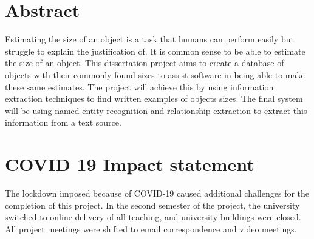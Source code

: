 \chapter*{\Large \center Abstract}

Estimating the size of an object is a task that humans can perform easily but struggle to explain the justification of. It is common sense to be able to estimate the size of an object. This dissertation project aims to create a database of objects with their commonly found sizes to assist software in being able to make these same estimates. The project will achieve this by using information extraction techniques to find written examples of objects sizes. The final system will be using named entity recognition and relationship extraction to extract this information from a text source.


\chapter*{\Large \center COVID 19 Impact statement}

The lockdown imposed because of COVID-19 caused additional challenges for the completion of this project. In the second semester of the project, the university switched to online delivery of all teaching, and university buildings were closed. All project meetings were shifted to email correspondence and video meetings.